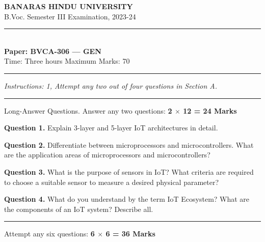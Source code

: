\documentclass[11pt,a4paper]{article}
\begin{document}
\begin{center}
  {\large\bfseries BANARAS HINDU UNIVERSITY}\\[2pt]
  {\normalsize B.Voc. Semester III Examination, 2023-24}\\[6pt]
  \rule{0.8\linewidth}{0.5pt}\\[6pt]
  {\large\bfseries Paper: BVCA-306 --- GEN}\\[4pt]
  {\normalsize Time: Three hours \hfill Maximum Marks: 70}
\end{center}

\rule{\linewidth}{0.4pt}

\smallskip



\noindent   \textit{Instructions: 1, Attempt any two out of four questions in Section A.}

\bigskip





\rule{\linewidth}{0.4pt}\smallskip

Long-Answer Questions. Answer any two questions: \hfill   \textbf{2 $ \times$ 12 = 24 Marks}

\medskip



\noindent   \textbf{Question 1.} Explain 3-layer and 5-layer IoT architectures in detail.

\medskip



\noindent   \textbf{Question 2.} Differentiate between microprocessors and microcontrollers. What are the application areas of microprocessors and microcontrollers?

\medskip



\noindent   \textbf{Question 3.} What is the purpose of sensors in IoT? What criteria are required to choose a suitable sensor to measure a desired physical parameter?

\medskip



\noindent   \textbf{Question 4.} What do you understand by the term IoT Ecosystem? What are the components of an IoT system? Describe all.

\bigskip


\rule{\linewidth}{0.4pt}\smallskip

Attempt any six questions: \hfill   \textbf{6 $ \times$ 6 = 36 Marks}
\end{document}
